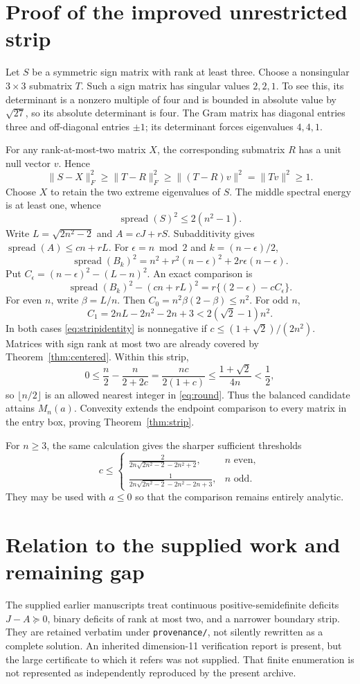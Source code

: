 \documentclass[11pt]{article}
\newcommand{\spn}{\operatorname{spread}}
\begin{document}
\section{Proof of the improved unrestricted strip}
Let $S$ be a symmetric sign matrix with rank at least three. Choose a nonsingular
$3\times3$ submatrix $T$. Such a sign matrix has singular values $2,2,1$.
To see this, its determinant is a nonzero multiple of four and is bounded in
absolute value by $\sqrt{27}$, so its absolute determinant is four. The Gram
matrix has diagonal entries three and off-diagonal entries $\pm1$; its
determinant forces eigenvalues $4,4,1$.

For any rank-at-most-two matrix $X$, the corresponding submatrix $R$ has a unit
null vector $v$. Hence
\[
 \|S-X\|_F^2\ge\|T-R\|_F^2\ge\|(T-R)v\|^2=\|Tv\|^2\ge1.
\]
Choose $X$ to retain the two extreme eigenvalues of $S$. The middle spectral
energy is at least one, whence
\[
 \spn(S)^2\le2(n^2-1).
\]
Write $L=\sqrt{2n^2-2}$ and $A=cJ+rS$. Subadditivity gives
$\spn(A)\le cn+rL$.
For $\epsilon=n\bmod2$ and $k=(n-\epsilon)/2$,
\[
 \spn(B_k)^2=n^2+r^2(n-\epsilon)^2+2r\epsilon(n-\epsilon).
\]
Put $C_\epsilon=(n-\epsilon)^2-(L-n)^2$. An exact comparison is
\begin{equation}\label{eq:stripidentity}
 \spn(B_k)^2-(cn+rL)^2=r\{(2-\epsilon)-cC_\epsilon\}.
\end{equation}
For even $n$, write $\beta=L/n$. Then
$C_0=n^2\beta(2-\beta)\le n^2$. For odd $n$,
\[
 C_1=2nL-2n^2-2n+3<2(\sqrt2-1)n^2.
\]
In both cases \eqref{eq:stripidentity} is nonnegative if
$c\le(1+\sqrt2)/(2n^2)$. Matrices with sign rank at most two are already
covered by Theorem~\ref{thm:centered}. Within this strip,
\[
 0\le\frac n2-\frac{n}{2+2c}
       =\frac{nc}{2(1+c)}\le\frac{1+\sqrt2}{4n}<\frac12,
\]
so $\lfloor n/2\rfloor$ is an allowed nearest integer in \eqref{eq:round}.
Thus the balanced candidate attains $M_n(a)$. Convexity extends the endpoint
comparison to every matrix in the entry box, proving Theorem~\ref{thm:strip}.

For $n\ge3$, the same calculation gives the sharper sufficient thresholds
\[
 c\le\begin{cases}
 \displaystyle\frac{2}{2n\sqrt{2n^2-2}-2n^2+2},& n\text{ even},\\[6pt]
 \displaystyle\frac{1}{2n\sqrt{2n^2-2}-2n^2-2n+3},& n\text{ odd}.
 \end{cases}
\]
They may be used with $a\le0$ so that the comparison remains entirely analytic.

\section{Relation to the supplied work and remaining gap}
The supplied earlier manuscripts treat continuous positive-semidefinite
deficits $J-A\succeq0$, binary deficits of rank at most two, and a narrower
boundary strip. They are retained verbatim under \texttt{provenance/}, not
silently rewritten as a complete solution. An inherited dimension-11
verification report is present, but the large certificate to which it refers
was not supplied. That finite enumeration is not represented as independently
reproduced by the present archive.
\end{document}
